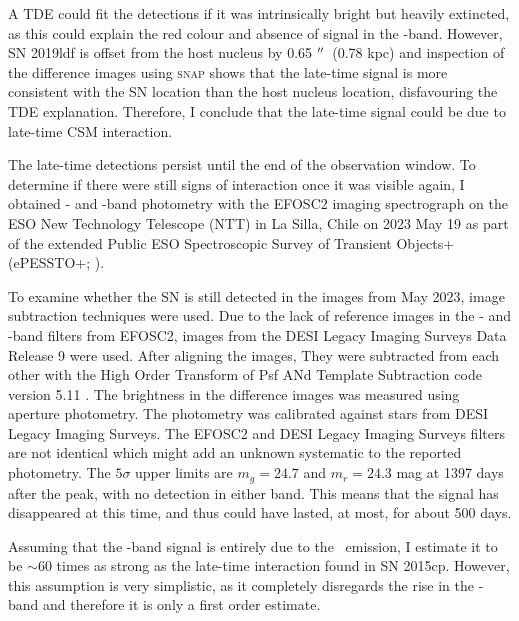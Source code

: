 \documentclass[a4paper,oneside,12pt, class=Latex/Classes/PhDthesisPSnPDF, crop=false]{standalone}
\begin{document}
A TDE could fit the detections if it was intrinsically bright but heavily extincted, as this could explain the red colour and absence of signal in the \ztfg-band. However, SN 2019ldf is offset from the host nucleus by 0.65 $^{\prime\prime}$~(0.78 kpc) and inspection of the difference images using \textsc{snap} shows that the late-time signal is more consistent with the SN location than the host nucleus location, disfavouring the TDE explanation. Therefore, I conclude that the late-time signal could be due to late-time CSM interaction.

The late-time detections persist until the end of the observation window. To determine if there were still signs of interaction once it was visible again, I obtained \ztfg- and \ztfr-band photometry with the EFOSC2 imaging spectrograph \citep{EFOSC2} on the ESO New Technology Telescope (NTT) in La Silla, Chile on 2023 May 19 as part of the extended Public ESO Spectroscopic Survey of Transient Objects+ (ePESSTO+; \citealt{PESSTO}).

To examine whether the SN is still detected in the images from May 2023, image subtraction techniques were used. Due to the lack of reference images in the \ztfg- and \ztfr-band filters from EFOSC2, images from the DESI Legacy Imaging Surveys Data Release 9 \citep{DESI-Legacy_Imaging_Surveys} were used. After aligning the images, They were subtracted from each other with the High Order Transform of Psf ANd Template Subtraction code version 5.11 \citep[\textsc{hotpants};][]{HOTPANTS}. The brightness in the difference images was measured using aperture photometry. The photometry was calibrated against stars from DESI Legacy Imaging Surveys. The EFOSC2 and DESI Legacy Imaging Surveys filters are not identical which might add an unknown systematic to the reported photometry. The $5\sigma$ upper limits are $m_g = 24.7$ and $m_r = 24.3$ mag at 1397 days after the peak, with no detection in either band. This means that the signal has disappeared at this time, and thus could have lasted, at most, for about 500 days.

Assuming that the \ztfr-band signal is entirely due to the \Halpha~emission, I estimate it to be $\sim$60 times as strong as the late-time interaction found in SN 2015cp. However, this assumption is very simplistic, as it completely disregards the rise in the \ztfi-band and therefore it is only a first order estimate.\\
\end{document}
